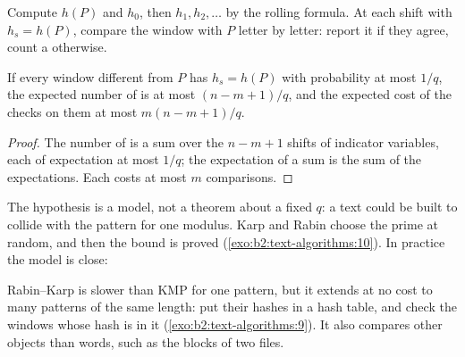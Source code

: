 \begin{method}\label{met:b2:text-algorithms:rabin-karp}
Compute $h(P)$ and $h_0$, then $h_1, h_2, \dots$ by the rolling formula. At each shift with $h_s = h(P)$, compare the
window with $P$ letter by letter: report it if they agree, count a 
otherwise.
\end{method}

\label{lst:b2:text-algorithms:rabin-karp}

\begin{proposition}\label{prop:b2:text-algorithms:spurious}
If every window different from $P$ has $h_s = h(P)$ with probability at most $1/q$, the expected number of  is at most $(n - m + 1)/q$, and the expected cost of the checks on them at most $m(n - m + 1)/q$.
\end{proposition}

\begin{proof}
The number of  is a sum over the $n - m + 1$ shifts of indicator variables, each of expectation at most
$1/q$; the expectation of a sum is the sum of the expectations. Each  costs at most $m$ comparisons.
\end{proof}

The hypothesis is a model, not a theorem about a fixed $q$: a text could be built to collide with the pattern for one
modulus. Karp and Rabin choose the prime at random, and then the bound is proved
(\cref{exo:b2:text-algorithms:10}). In practice the model is close:

\label{out:b2:text-algorithms:rk}

Rabin--Karp is slower than KMP for one pattern, but it extends at no cost to many patterns of the same length: put
their hashes in a hash table, and check the windows whose hash is in it (\cref{exo:b2:text-algorithms:9}). It also
compares other objects than words, such as the blocks of two files.

